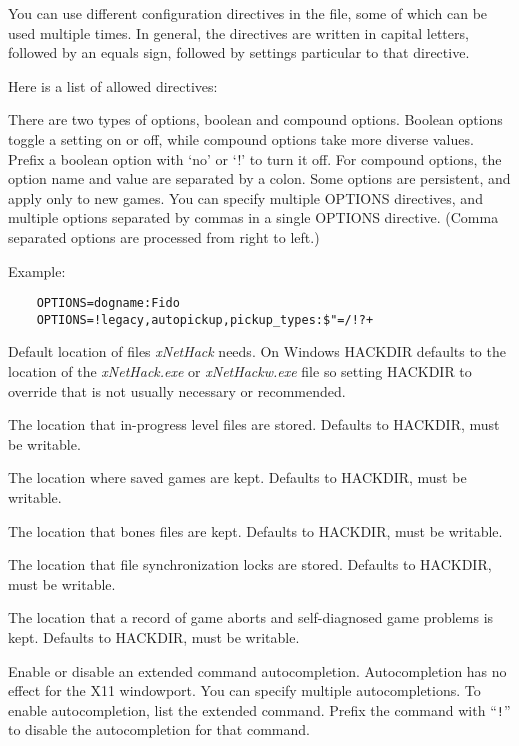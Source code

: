 You can use different configuration directives in the file, some
of which can be used multiple times.
In general, the directives are
written in capital letters, followed by an equals sign, followed by
settings particular to that directive.

Here is a list of allowed directives:

\blist{}
\item[\bb{OPTIONS}]
There are two types of options, boolean and compound options.
Boolean options toggle a setting on or off, while compound options
take more diverse values.
Prefix a boolean option with `no' or `!' to turn it off.
For compound options, the option name and value are separated by a colon.
Some options are persistent, and apply only to new games.
You can specify multiple OPTIONS directives, and multiple options
separated by commas in a single OPTIONS directive.
(Comma separated options are processed from right to left.)

Example:
\begin{verbatim}
    OPTIONS=dogname:Fido
    OPTIONS=!legacy,autopickup,pickup_types:$"=/!?+
\end{verbatim}

\item[\bb{HACKDIR}]
Default location of files {\it xNetHack\/} needs. On Windows HACKDIR
defaults to the location of the {\it xNetHack.exe\/} or {\it xNetHackw.exe\/} file
so setting HACKDIR to override that is not usually necessary or recommended.
\item[\bb{LEVELDIR}]
The location that in-progress level files are stored. Defaults to HACKDIR,
must be writable.
\item[\bb{SAVEDIR}]
The location where saved games are kept. Defaults to HACKDIR, must be
writable.
\item[\bb{BONESDIR}]
The location that bones files are kept. Defaults to HACKDIR, must be
writable.
\item[\bb{LOCKDIR}]
The location that file synchronization locks are stored. Defaults to
HACKDIR, must be writable.
\item[\bb{TROUBLEDIR}]
The location that a record of game aborts and self-diagnosed game problems
is kept. Defaults to HACKDIR, must be writable.
%
%
\item[\bb{AUTOCOMPLETE}]
Enable or disable an extended command autocompletion.
Autocompletion has no effect for the X11 windowport.
You can specify multiple autocompletions. To enable
autocompletion, list the extended command. Prefix the
command with ``{{\tt !}}'' to disable the autocompletion
for that command.

